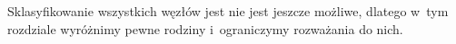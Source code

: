 Sklasyfikowanie wszystkich węzłów jest nie jest jeszcze możliwe, dlatego w~tym rozdziale wyróżnimy pewne rodziny i~ograniczymy rozważania do nich.
